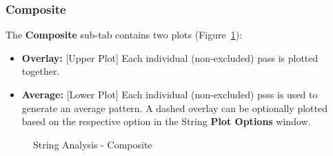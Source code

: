 \documentclass[10pt,letterpaper,titlepage]{article}
\begin{document}
    \subsubsection{Composite}
    The \textbf{Composite} sub-tab contains two plots (Figure~\ref{fig:string_composite}):
    \begin{itemize}
        \item \textbf{Overlay:} [Upper Plot] Each individual (non-excluded) pass is plotted together. 
        \item \textbf{Average:} [Lower Plot] Each individual (non-excluded) psss is used to generate an average pattern. A dashed overlay can be optionally plotted based on the respective option in the String \textbf{Plot Options} window.
    \end{itemize}
    \begin{figure}[hb]
        \centering
        \caption{String Analysis - Composite}
        \label{fig:string_composite}
    \end{figure}
    \newpage
\end{document}
